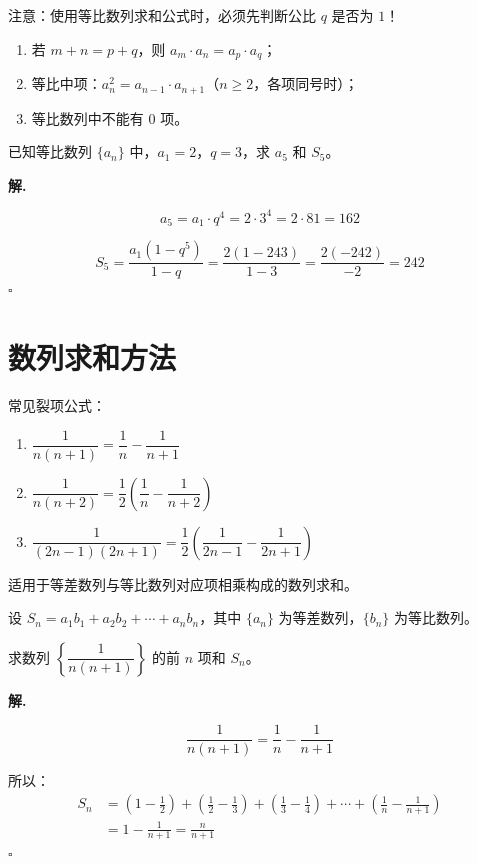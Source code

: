 \begin{note}
注意：使用等比数列求和公式时，必须先判断公比 $q$ 是否为 $1$！
\end{note}

\begin{property}[等比数列的性质]
\begin{enumerate}
    \item 若 $m + n = p + q$，则 $a_m \cdot a_n = a_p \cdot a_q$；
    \item 等比中项：$a_n^2 = a_{n-1} \cdot a_{n+1}$（$n \geq 2$，各项同号时）；
    \item 等比数列中不能有 $0$ 项。
\end{enumerate}
\end{property}

\begin{example}
已知等比数列 $\{a_n\}$ 中，$a_1 = 2$，$q = 3$，求 $a_5$ 和 $S_5$。
\end{example}

\textbf{解.}

\[ a_5 = a_1 \cdot q^4 = 2 \cdot 3^4 = 2 \cdot 81 = 162 \]

\[ S_5 = \frac{a_1(1-q^5)}{1-q} = \frac{2(1-243)}{1-3} = \frac{2(-242)}{-2} = 242 \]
\hfill $\square$

\section{数列求和方法}

\begin{theorem}[裂项相消法]
常见裂项公式：
\begin{enumerate}
    \item $\dfrac{1}{n(n+1)} = \dfrac{1}{n} - \dfrac{1}{n+1}$
    \item $\dfrac{1}{n(n+2)} = \dfrac{1}{2}\left(\dfrac{1}{n} - \dfrac{1}{n+2}\right)$
    \item $\dfrac{1}{(2n-1)(2n+1)} = \dfrac{1}{2}\left(\dfrac{1}{2n-1} - \dfrac{1}{2n+1}\right)$
\end{enumerate}
\end{theorem}

\begin{theorem}[错位相减法]
适用于等差数列与等比数列对应项相乘构成的数列求和。

设 $S_n = a_1b_1 + a_2b_2 + \cdots + a_nb_n$，其中 $\{a_n\}$ 为等差数列，$\{b_n\}$ 为等比数列。
\end{theorem}

\begin{example}
求数列 $\left\{\dfrac{1}{n(n+1)}\right\}$ 的前 $n$ 项和 $S_n$。
\end{example}

\textbf{解.}

\[ \frac{1}{n(n+1)} = \frac{1}{n} - \frac{1}{n+1} \]

所以：
\begin{align*}
S_n &= \left(1 - \frac{1}{2}\right) + \left(\frac{1}{2} - \frac{1}{3}\right) + \left(\frac{1}{3} - \frac{1}{4}\right) + \cdots + \left(\frac{1}{n} - \frac{1}{n+1}\right) \\
&= 1 - \frac{1}{n+1} = \frac{n}{n+1}
\end{align*}
\hfill $\square$
